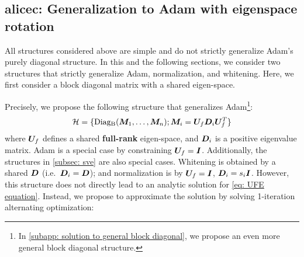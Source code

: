 \subsection{\gls{alicec}: Generalization to Adam with eigenspace rotation}
\label{subsec: alicec}
\label{subsubsec: alice-c optimizer}
All structures considered above are simple and do not strictly generalize Adam's purely diagonal structure. In this and the following sections, we consider two structures that strictly generalize Adam, normalization, and whitening. Here, we first consider a block diagonal matrix with a shared eigen-space. 

Precisely, we propose the following structure that generalizes Adam\footnote{In \cref{subapp: solution to general block diagonal}, we propose an even more general block diagonal structure.}:
\begin{align}
    \mathcal{H} = \{\operatorname{Diag_B}({\bm{M}}_1, \ldots, {\bm{M}}_n); {\bm{M}}_i ={\bm{U}}_{f}{\bm{D}}_i{\bm{U}}_{f}^T\}
    \label{eq: alicec structure}
\end{align} 
where ${\bm{U}}_{f}$ defines a shared \textbf{full-rank} eigen-space, and ${\bm{D}}_i$ is a positive eigenvalue matrix. Adam is a special case by constraining ${\bm{U}}_{f}={\bm{I}}$. Additionally, the structures in \cref{subsec: sve} are also special cases. Whitening is obtained by a shared ${\bm{D}}$ (i.e.~${\bm{D}}_i={\bm{D}}$); and normalization is by ${\bm{U}}_{f}={\bm{I}}$, ${\bm{D}}_i=s_i{\bm{I}}$. 
However, this structure does not directly lead to an analytic solution for \cref{eq: UFE equation}. 
Instead, we propose to approximate the solution by solving 1-iteration alternating optimization: 

